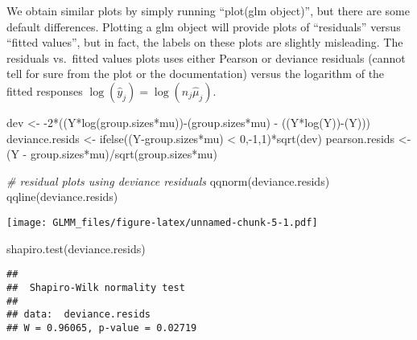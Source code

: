 \documentclass[
]{book}
\newenvironment{Shaded}{\begin{snugshade}}{\end{snugshade}}
\newcommand{\CommentTok}[1]{\textcolor[rgb]{0.56,0.35,0.01}{\textit{#1}}}
\newcommand{\DecValTok}[1]{\textcolor[rgb]{0.00,0.00,0.81}{#1}}
\newcommand{\FunctionTok}[1]{\textcolor[rgb]{0.00,0.00,0.00}{#1}}
\newcommand{\NormalTok}[1]{#1}
\newcommand{\OtherTok}[1]{\textcolor[rgb]{0.56,0.35,0.01}{#1}}
\newcommand{\SpecialCharTok}[1]{\textcolor[rgb]{0.00,0.00,0.00}{#1}}
\begin{document}
We obtain similar plots by simply running ``plot(glm object)'', but there are some default differences. Plotting a glm object will provide plots of ``residuals'' versus ``fitted values'', but in fact, the labels on these plots are slightly misleading. The residuals vs.~fitted values plots uses either Pearson or deviance residuals (cannot tell for sure from the plot or the documentation) versus the logarithm of the fitted responses \(\log(\hat y_j) =\log(n_j\hat\mu_j)\).

\begin{Shaded}
\begin{Highlighting}[]
\NormalTok{dev }\OtherTok{\textless{}{-}} \SpecialCharTok{{-}}\DecValTok{2}\SpecialCharTok{*}\NormalTok{((Y}\SpecialCharTok{*}\FunctionTok{log}\NormalTok{(group.sizes}\SpecialCharTok{*}\NormalTok{mu))}\SpecialCharTok{{-}}\NormalTok{(group.sizes}\SpecialCharTok{*}\NormalTok{mu) }\SpecialCharTok{{-}}\NormalTok{ ((Y}\SpecialCharTok{*}\FunctionTok{log}\NormalTok{(Y))}\SpecialCharTok{{-}}\NormalTok{(Y)))}
\NormalTok{deviance.resids }\OtherTok{\textless{}{-}} \FunctionTok{ifelse}\NormalTok{((Y}\SpecialCharTok{{-}}\NormalTok{group.sizes}\SpecialCharTok{*}\NormalTok{mu) }\SpecialCharTok{\textless{}} \DecValTok{0}\NormalTok{,}\SpecialCharTok{{-}}\DecValTok{1}\NormalTok{,}\DecValTok{1}\NormalTok{)}\SpecialCharTok{*}\FunctionTok{sqrt}\NormalTok{(dev)}
\NormalTok{pearson.resids }\OtherTok{\textless{}{-}}\NormalTok{ (Y }\SpecialCharTok{{-}}\NormalTok{ group.sizes}\SpecialCharTok{*}\NormalTok{mu)}\SpecialCharTok{/}\FunctionTok{sqrt}\NormalTok{(group.sizes}\SpecialCharTok{*}\NormalTok{mu)}

\CommentTok{\# residual plots using deviance residuals}
\FunctionTok{qqnorm}\NormalTok{(deviance.resids)}
\FunctionTok{qqline}\NormalTok{(deviance.resids)}
\end{Highlighting}
\end{Shaded}

\texttt{[image: GLMM\_files/figure-latex/unnamed-chunk-5-1.pdf]}

\begin{Shaded}
\begin{Highlighting}[]
\FunctionTok{shapiro.test}\NormalTok{(deviance.resids)}
\end{Highlighting}
\end{Shaded}

\begin{verbatim}
## 
##  Shapiro-Wilk normality test
## 
## data:  deviance.resids
## W = 0.96065, p-value = 0.02719
\end{verbatim}
\end{document}
